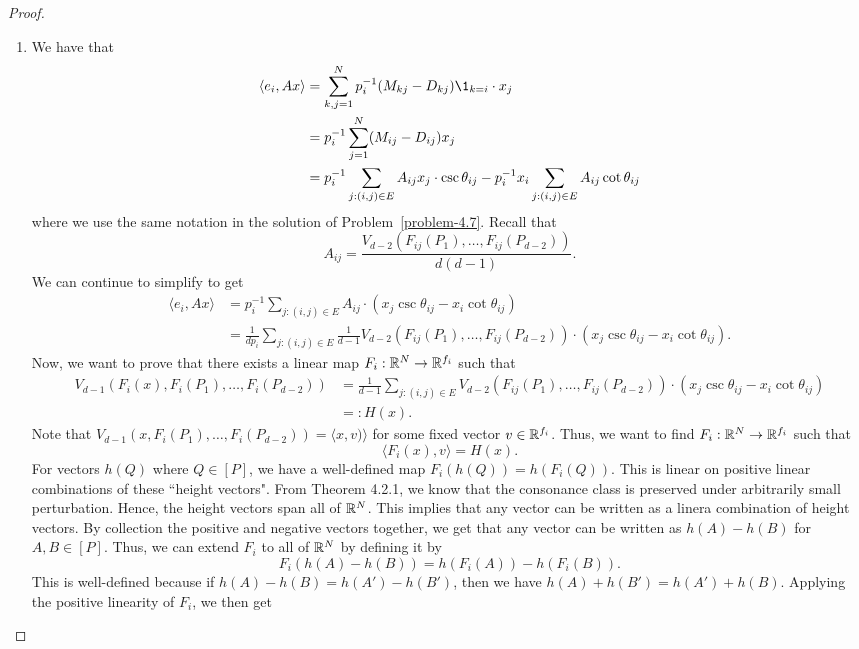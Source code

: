 \documentclass[12pt]{article}
\begin{document}
\begin{proof}
\begin{enumerate}[label = (\alph*)]
		\item We have that 
		\begin{align*}
			\langle e_i, Ax \rangle & = \sum_{k, j = 1}^N p_i^{-1}(M_{kj} - D_{kj}) \1_{k = i} \cdot x_j \\
			& = p_i^{-1} \sum_{j = 1}^N  (M_{ij} - D_{ij}) x_j \\
			& = p_i^{-1} \sum_{j : (i, j) \in E} A_{ij} x_j \cdot \csc \theta_{ij} - p_i^{-1} x_i \sum_{j : (i, j) \in E} A_{ij} \cot \theta_{ij}
		\end{align*}
		where we use the same notation in the solution of Problem~\ref{problem-4.7}. Recall that 
		\[
			A_{ij} = \frac{V_{d-2}(F_{ij}(P_1), \ldots, F_{ij}(P_{d-2}))}{d(d-1)}. 
		\]
		We can continue to simplify to get 
		\begin{align*}
			\langle e_i, Ax \rangle & = p_i^{-1} \sum_{j : (i, j) \in E} A_{ij} \cdot (x_j \csc \theta_{ij} - x_i \cot \theta_{ij}) \\
			& = \frac{1}{dp_i} \sum_{j : (i, j) \in E} \frac{1}{d-1} V_{d-2}(F_{ij}(P_1), \ldots, F_{ij}(P_{d-2})) \cdot (x_j \csc \theta_{ij} - x_i \cot \theta_{ij}).
		\end{align*}
		Now, we want to prove that there exists a linear map $F_i: \mathbb{R}^N \to \mathbb{R}^{f_i}$ such that 
		\begin{align*}
			V_{d-1}(F_i(x), F_i(P_1), \ldots, F_i(P_{d-2})) & = \frac{1}{d-1} \sum_{j : (i, j) \in E} V_{d-2}(F_{ij}(P_1), \ldots, F_{ij}(P_{d-2})) \cdot (x_j \csc \theta_{ij} - x_i \cot \theta_{ij}) \\
			& =: H(x).
		\end{align*}
		Note that $V_{d-1}(x, F_i(P_1), \ldots, F_i(P_{d-2})) = \langle x, v) \rangle$ for some fixed vector $v \in \mathbb{R}^{f_i}$. Thus, we want to find $F_i : \mathbb{R}^N \to \mathbb{R}^{f_i}$ such that 
		\[
			\langle F_i (x), v \rangle = H(x).
		\]
		For vectors $h(Q)$ where $Q \in [P]$, we have a well-defined map $F_i(h(Q)) = h(F_i(Q))$. This is linear on positive linear combinations of these ``height vectors". From Theorem 4.2.1, we know that the consonance class is preserved under arbitrarily small perturbation. Hence, the height vectors span all of $\mathbb{R}^N$. This implies that any vector can be written as a linera combination of height vectors. By collection the positive and negative vectors together, we get that any vector can be written as $h(A) - h(B)$ for $A, B \in [P]$. Thus, we can extend $F_i$ to all of $\mathbb{R}^N$ by defining it by
		\[
			F_i(h(A) - h(B)) = h(F_i(A)) - h(F_i(B)).
		\]
		This is well-defined because if $h(A) - h(B) = h(A') - h(B')$, then we have $h(A) + h(B') = h(A') + h(B)$. Applying the positive linearity of $F_i$, we then get

\end{enumerate}
\end{proof}
\end{document}
